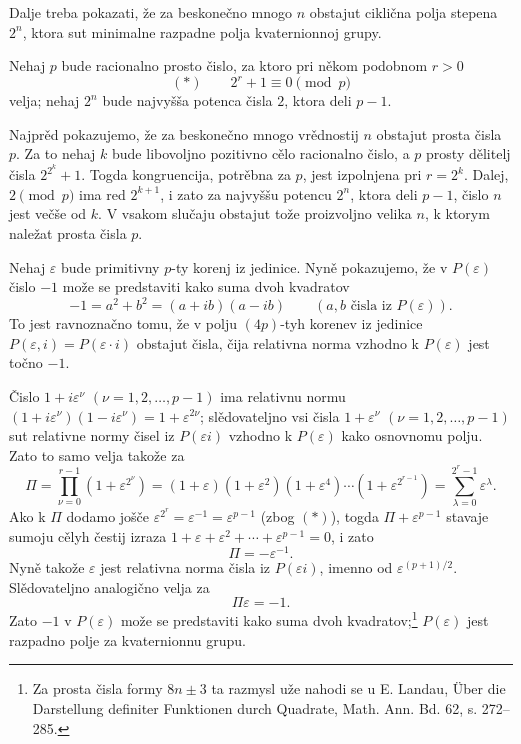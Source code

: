 \documentclass[11pt]{article}
\begin{document}
\noindent Dalje treba pokazati, že za beskonečno mnogo $n$ obstajut ciklična polja stepena $2^n$, ktora sut minimalne razpadne polja kvaternionnoj grupy.

\medskip

\noindent Nehaj $p$ bude racionalno prosto čislo, za ktoro pri někom podobnom $r>0$
\[
        (*)\qquad 2^r+1\equiv0\pmod p
\]
velja; nehaj $2^n$ bude najvyšša potenca čisla $2$, ktora deli $p-1$.

Najprěd pokazujemo, že za beskonečno mnogo vrědnostij $n$ obstajut prosta čisla $p$. Za to nehaj $k$ bude libovoljno pozitivno cělo racionalno čislo, a $p$ prosty dělitelj čisla $2^{2^k}+1$. Togda kongruencija, potrěbna za $p$, jest izpolnjena pri $r=2^k$. Dalej, $2\pmod p$ ima red $2^{k+1}$, i zato za najvyššu potencu $2^n$, ktora deli $p-1$, čislo $n$ jest večše od $k$. V vsakom slučaju obstajut tože proizvoljno velika $n$, k ktorym naležat prosta čisla $p$.

Nehaj $\varepsilon$ bude primitivny $p$-ty korenj iz jedinice. Nyně pokazujemo, že v $P(\varepsilon)$ čislo $-1$ može se predstaviti kako suma dvoh kvadratov
\[
        -1=a^2+b^2=(a+ib)(a-ib)\qquad (a,b\text{ čisla iz }P(\varepsilon)).
\]
To jest ravnoznačno tomu, že v polju $(4p)$-tyh korenev iz jedinice $P(\varepsilon,i)=P(\varepsilon\cdot i)$ obstajut čisla, čija relativna norma vzhodno k $P(\varepsilon)$ jest točno $-1$.

Čislo $1+i\varepsilon^\nu$ $(\nu=1,2,\ldots,p-1)$ ima relativnu normu $(1+i\varepsilon^\nu)(1-i\varepsilon^\nu)=1+\varepsilon^{2\nu}$; slědovateljno vsi čisla $1+\varepsilon^\nu$ $(\nu=1,2,\ldots,p-1)$ sut relativne normy čisel iz $P(\varepsilon i)$ vzhodno k $P(\varepsilon)$ kako osnovnomu polju. Zato to samo velja takože za
\[
\Pi=\prod_{\nu=0}^{r-1}(1+\varepsilon^{2^\nu})
=(1+\varepsilon)(1+\varepsilon^2)(1+\varepsilon^4)\cdots(1+\varepsilon^{2^{r-1}})
=\sum_{\lambda=0}^{2^r-1}\varepsilon^\lambda.
\]
Ako k $\Pi$ dodamo jošče $\varepsilon^{2^r}=\varepsilon^{-1}=\varepsilon^{p-1}$ (zbog $(*)$), togda $\Pi+\varepsilon^{p-1}$ stavaje sumoju cělyh čestij izraza $1+\varepsilon+\varepsilon^2+\cdots+\varepsilon^{p-1}=0$, i zato
\[
        \Pi=-\varepsilon^{-1}.
\]
Nyně takože $\varepsilon$ jest relativna norma čisla iz $P(\varepsilon i)$, imenno od $\varepsilon^{(p+1)/2}$. Slědovateljno analogično velja za
\[
        \Pi\varepsilon=-1.
\]
Zato $-1$ v $P(\varepsilon)$ može se predstaviti kako suma dvoh kvadratov;\footnote{Za prosta čisla formy $8n\pm3$ ta razmysl uže nahodi se u E. Landau, Über die Darstellung definiter Funktionen durch Quadrate, Math. Ann. Bd. 62, s. 272--285.} $P(\varepsilon)$ jest razpadno polje za kvaternionnu grupu.
\end{document}
